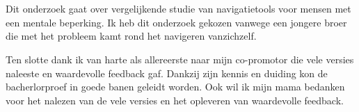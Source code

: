 
\chapter*{}%
\label{ch:voorwoord}




Dit onderzoek gaat over vergelijkende studie van navigatietools voor mensen met een mentale beperking. Ik heb dit onderzoek gekozen vanwege een jongere broer die met het probleem kamt rond het navigeren vanzichzelf.

Ten slotte dank ik van harte als allereerste naar mijn co-promotor die vele versies naleeste en waardevolle feedback gaf. Dankzij zijn kennis en duiding kon de bacherlorproef in goede banen geleidt worden. Ook wil ik mijn mama bedanken voor het nalezen van de vele versies en het opleveren van waardevolle feedback.

